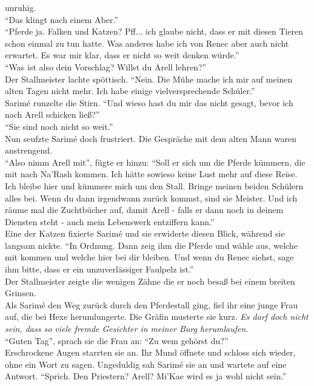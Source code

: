 unruhig.\\
``Das klingt nach einem Aber.''\\
``Pferde ja. Falken und Katzen? Pff... ich glaube nicht, dass er mit diesen Tieren schon einmal zu 
tun hatte. Was anderes habe ich von Renec aber auch nicht erwartet. Es war mir klar, dass er nicht 
so weit denken würde.''\\
``Was ist also dein Vorschlag? Willst du Arell lehren?''\\
Der Stallmeister lachte spöttisch. ``Nein. Die Mühe mache ich mir auf meinen alten Tagen nicht 
mehr. Ich habe einige vielversprechende Schüler.''\\
Sarimé runzelte die Stirn. ``Und wieso hast du mir das nicht gesagt, bevor ich nach Arell schicken 
ließ?''\\
``Sie sind noch nicht so weit.''\\
Nun seufzte Sarimé doch frustriert. Die Gespräche mit dem alten Mann waren anstrengend.\\
``Also nimm Arell mit'', fügte er hinzu: ``Soll er sich um die Pferde kümmern, die mit nach Na'Rash 
kommen. Ich hätte sowieso keine Lust mehr auf diese Reise. Ich bleibe hier und kümmere mich um den 
Stall. Bringe meinen beiden Schülern alles bei. Wenn du dann irgendwann zurück kommst, sind sie 
Meister. Und ich räume mal die Zuchtbücher auf, damit Arell - falls er dann noch in deinem Diensten 
steht - auch mein Lebenswerk entziffern kann.''\\
Eine der Katzen fixierte Sarimé und sie erwiderte diesen Blick, während sie langsam nickte. ``In 
Ordnung. Dann zeig ihm die Pferde und wähle aus, welche mit kommen und welche hier bei dir bleiben. 
Und wenn du Renec siehst, sage ihm bitte, dass er ein unzuverlässiger Faulpelz ist.''\\
Der Stallmeister zeigte die wenigen Zähne die er noch besaß bei einem breiten Grinsen.\\
Als Sarimé den Weg zurück durch den Pferdestall ging, fiel ihr eine junge Frau auf, die bei Hexe 
herumlungerte. Die Gräfin musterte sie kurz. \textit{Es darf doch nicht sein, dass so viele fremde 
Gesichter in meiner Burg herumlaufen.}\\
``Guten Tag'', sprach sie die Frau an: ``Zu wem gehörst du?''\\
Erschrockene Augen starrten sie an. Ihr Mund öffnete und schloss sich wieder, ohne ein Wort zu 
sagen. Ungeduldig sah Sarimé sie an und wartete auf eine Antwort. ``Sprich. Den Priestern? Arell? 
Mi'Kae wird es ja wohl nicht sein.''\\
